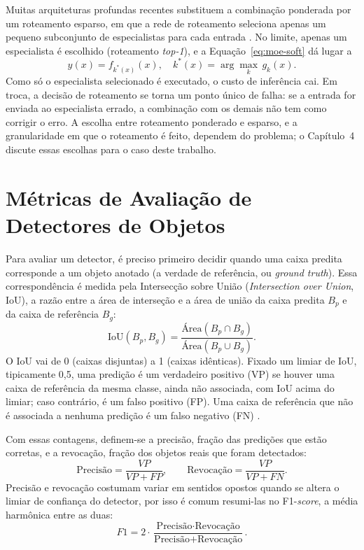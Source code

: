 Muitas arquiteturas profundas recentes substituem a combinação ponderada por um roteamento esparso, em que a rede de roteamento seleciona apenas um pequeno subconjunto de especialistas para cada entrada \cite{shazeer2017outrageously}. No limite, apenas um especialista é escolhido (roteamento \textit{top-1}), e a Equação~\ref{eq:moe-soft} dá lugar a
\begin{equation}
    y(x) = f_{k^*(x)}(x), \quad k^*(x) = \arg\max_{k} \, g_k(x).
    \label{eq:moe-hard}
\end{equation}
Como só o especialista selecionado é executado, o custo de inferência cai. Em troca, a decisão de roteamento se torna um ponto único de falha: se a entrada for enviada ao especialista errado, a combinação com os demais não tem como corrigir o erro. A escolha entre roteamento ponderado e esparso, e a granularidade em que o roteamento é feito, dependem do problema; o Capítulo~4 discute essas escolhas para o caso deste trabalho.

\section{Métricas de Avaliação de Detectores de Objetos}
\label{sec:metricas-avaliacao}

Para avaliar um detector, é preciso primeiro decidir quando uma caixa predita corresponde a um objeto anotado (a verdade de referência, ou \textit{ground truth}). Essa correspondência é medida pela Intersecção sobre União (\textit{Intersection over Union}, IoU), a razão entre a área de interseção e a área de união da caixa predita $B_p$ e da caixa de referência $B_g$:
\begin{equation}
    \mathrm{IoU}(B_p, B_g) = \frac{\mbox{Área}(B_p \cap B_g)}{\mbox{Área}(B_p \cup B_g)}.
    \label{eq:iou}
\end{equation}
O IoU vai de 0 (caixas disjuntas) a 1 (caixas idênticas). Fixado um limiar de IoU, tipicamente 0,5, uma predição é um verdadeiro positivo (VP) se houver uma caixa de referência da mesma classe, ainda não associada, com IoU acima do limiar; caso contrário, é um falso positivo (FP). Uma caixa de referência que não é associada a nenhuma predição é um falso negativo (FN) \cite{everingham2010pascalvoc}.

Com essas contagens, definem-se a precisão, fração das predições que estão corretas, e a revocação, fração dos objetos reais que foram detectados:
\begin{equation}
    \mbox{Precisão} = \frac{VP}{VP + FP}, \qquad
    \mbox{Revocação} = \frac{VP}{VP + FN}.
    \label{eq:precision-recall}
\end{equation}
Precisão e revocação costumam variar em sentidos opostos quando se altera o limiar de confiança do detector, por isso é comum resumi-las no F1-\textit{score}, a média harmônica entre as duas:
\begin{equation}
    F1 = 2 \cdot \frac{\mbox{Precisão} \cdot \mbox{Revocação}}{\mbox{Precisão} + \mbox{Revocação}}.
    \label{eq:f1}
\end{equation}

